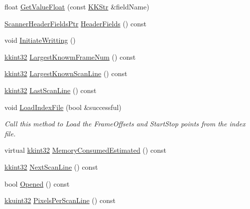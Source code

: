 \begin{DoxyCompactItemize}
\item 
float \hyperlink{class_k_k_l_s_c_1_1_scanner_file_a2b533595a68a26f2b2dabfa393434f85}{Get\+Value\+Float} (const \hyperlink{class_k_k_b_1_1_k_k_str}{K\+K\+Str} \&field\+Name)
\item 
\hyperlink{namespace_k_k_l_s_c_a7c06efc9062d7120e1fbf26f44ce4089}{Scanner\+Header\+Fields\+Ptr} \hyperlink{class_k_k_l_s_c_1_1_scanner_file_ad48ac6314d8849a6d5ad43911c2e695f}{Header\+Fields} () const 
\item 
void \hyperlink{class_k_k_l_s_c_1_1_scanner_file_a0786c88e6071cf4437bdc9dd02bebfd3}{Initiate\+Writting} ()
\item 
\hyperlink{namespace_k_k_b_a8fa4952cc84fda1de4bec1fbdd8d5b1b}{kkint32} \hyperlink{class_k_k_l_s_c_1_1_scanner_file_a15b74253eff7373f2ac7d5ac027a8347}{Largest\+Knowm\+Frame\+Num} () const 
\item 
\hyperlink{namespace_k_k_b_a8fa4952cc84fda1de4bec1fbdd8d5b1b}{kkint32} \hyperlink{class_k_k_l_s_c_1_1_scanner_file_ad47af50f46b1befbd987917675655c8e}{Largest\+Known\+Scan\+Line} () const 
\item 
\hyperlink{namespace_k_k_b_a8fa4952cc84fda1de4bec1fbdd8d5b1b}{kkint32} \hyperlink{class_k_k_l_s_c_1_1_scanner_file_a33dd269414d2dedc2fdbbaef3812073c}{Last\+Scan\+Line} () const 
\item 
void \hyperlink{class_k_k_l_s_c_1_1_scanner_file_aeec72fa0edaa84fe363efa7a3b27f13d}{Load\+Index\+File} (bool \&successful)
\begin{DoxyCompactList}\small\item\em Call this method to Load the Frame\+Offsets and Start\+Stop points from the index file. \end{DoxyCompactList}\item 
virtual \hyperlink{namespace_k_k_b_a8fa4952cc84fda1de4bec1fbdd8d5b1b}{kkint32} \hyperlink{class_k_k_l_s_c_1_1_scanner_file_a747991e6012f7a04cf0a2c60b0cfd551}{Memory\+Consumed\+Estimated} () const 
\item 
\hyperlink{namespace_k_k_b_a8fa4952cc84fda1de4bec1fbdd8d5b1b}{kkint32} \hyperlink{class_k_k_l_s_c_1_1_scanner_file_a6cce06bec305bd380e13933d5de61618}{Next\+Scan\+Line} () const 
\item 
bool \hyperlink{class_k_k_l_s_c_1_1_scanner_file_a6a0bd3f67dcfed4bd936e425daa7d519}{Opened} () const 
\item 
\hyperlink{namespace_k_k_b_af8d832f05c54994a1cce25bd5743e19a}{kkuint32} \hyperlink{class_k_k_l_s_c_1_1_scanner_file_a51f3bf3ceae3ddf3b61aa79d27d23b39}{Pixels\+Per\+Scan\+Line} () const 

\end{DoxyCompactItemize}

